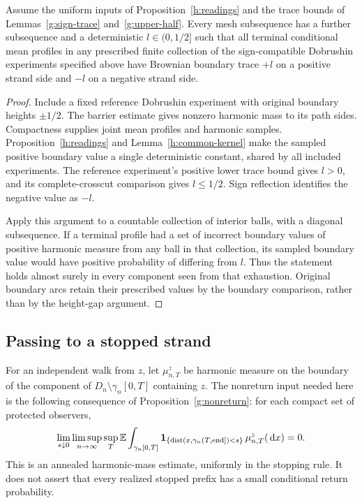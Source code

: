 \begin{proposition}\label{h:height-gap}
Assume the uniform inputs of Proposition~\ref{h:readings} and the
trace bounds of Lemmas~\ref{g:sign-trace} and~\ref{g:upper-half}.
Every mesh subsequence has a
further subsequence and a deterministic $l\in(0,1/2]$ such that all
terminal conditional mean profiles in any prescribed finite collection
of the sign-compatible Dobrushin experiments specified above have
Brownian boundary trace $+l$ on a
positive strand side and $-l$ on a negative strand side.
\end{proposition}
\begin{proof}
Include a fixed reference Dobrushin experiment with original boundary
heights $\pm1/2$. The barrier estimate gives nonzero harmonic mass to
its path sides. Compactness supplies joint mean profiles and harmonic
samples. Proposition~\ref{h:readings} and
Lemma~\ref{h:common-kernel} make the sampled positive boundary value a
single deterministic constant, shared by all included experiments.
The reference experiment's positive lower trace bound gives $l>0$,
and its complete-crosscut comparison gives $l\le1/2$.
Sign reflection identifies the negative value as $-l$.

Apply this argument to a countable collection of interior balls, with
a diagonal subsequence. If a terminal profile had a set of incorrect
boundary values of positive harmonic measure from any ball in that
collection, its sampled boundary value would have positive probability
of differing from $l$. Thus the statement holds almost surely in
every component seen from that exhaustion. Original boundary arcs retain
their prescribed values by the boundary comparison, rather than by the
height-gap argument.
\end{proof}

\subsection{Passing to a stopped strand}

For an independent walk from $z$, let $\mu^z_{n,T}$ be harmonic measure on
the boundary of the component of $D_n\setminus\gamma_n[0,T]$ containing
$z$. The nonreturn input needed here is the following consequence of
Proposition~\ref{g:nonreturn}: for each compact set of protected observers,
\begin{equation}\label{h:nr}
 \lim_{s\downarrow0}\limsup_{n\to\infty}\sup_T
 \mathbb E\int_{\gamma_n[0,T]}
 \mathbf1_{\{\operatorname{dist}(x,\gamma_n(T,\mathrm{end}])<s\}}
       \,\mu^z_{n,T}(\,\mathrm d x)=0.
\end{equation}
This is an annealed harmonic-mass estimate, uniformly in the stopping
rule. It does not assert that every realized stopped prefix has a
small conditional return probability.

